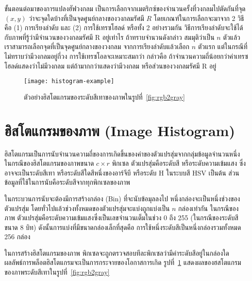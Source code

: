 ขั้นตอนต่อมาของการแปลงฮัฟวงกลม เป็นการเลือกจากเมตริกซ์ของจำนวนครั้งที่วงกลมไปตัดกันที่จุด $(x,y)$ ว่าจะจุดใดบ้างที่เป็นจุดศูนย์กลางของวงกลมรัศมี $R$ โดยเกณฑ์ในการเลือกจะมาจาก 2 วิธี คือ (1) การเรียงลำดับ และ (2) การใช้เทรซโฮลด์ หรือทั้ง 2 อย่างรวมกัน วิธีการเรียงลำดับจะใช้ได้กับภาพที่รู้ว่ามีจำนวนของวงกลมรัศมี R อยู่เท่าไร ถ้าทราบจำนวนดังกล่าว สมมุติว่าเป็น $n$ ตัวแล้ว เราสามารถเลือกจุดที่เป็นจุดศูนย์กลางของวงกลม จากการเรียงลำดับแล้วเลือก $n$ ตัวแรก แต่ในกรณีที่ไม่ทราบว่ามีวงกลมอยู่กี่วง การใช้เทรซโอลจะเหมาะสมกว่า กล่าวคือ ถ้าจำนวนความถี่น้อยกว่าค่าเทรซโฮลด์แสดงว่าไม่มีวงกลม แต่ถ้ามากกว่าแสดงว่ามีวงกลม หรือส่วนของวงกลมรัศมี R อยู่

\begin{figure}[!ht]
\centering
\texttt{[image: histogram-example]}
\caption{ตัวอย่างฮิสโตแกรมของระดับสีเทาของภาพในรูปที่~\ref{fig:rgb2gray}}
\label{fig:histogram}
\end{figure}

\section{ฮิสโตแกรมของภาพ (Image Histogram)}
ฮิสโตแกรมเป็นการนับจำนวนความถี่ของการเกิดขึ้นของค่าของตัวแปรสุ่มจากกลุ่มข้อมูลจำนวนหนึ่ง ในกรณีของฮิสโตแกรมของภาพขนาด $c\times r$ พิกเซล ตัวแปรสุ่มคือระดับสี หรือระดับความเข้มแสง ซึ่งอาจจะเป็นระดับสีเทา หรือระดับสีใดสีหนึ่งของอาร์จีบี หรือระดับ H ในระบบสี HSV เป็นต้น ส่วนข้อมูลที่ใช้ในการนับคือระดับสีจากทุกพิกเซลของภาพ

ในกระบวนการนับจะต้องมีการสร้างกล่อง (Bin) ที่จะนับข้อมุลลงไป หนึ่งกล่องจะเป็นหนึ่งช่วงของตัวแปรสุ่ม โดยทั่วไปแล้วช่วงทั้งหมดของตัวแปรสุ่มจะแบ่งถูกแบ่งเป็น $n$ กล่องเท่ากัน ในกรณีของภาพ ตัวแปรสุ่มคือระดับความเข้มแสงซึ่งเป็นเลขจำนวนเต็มในช่วง 0 ถึง 255  (ในกรณีของระดับสีขนาด 8 บิท) ดังนั้นการแบ่งที่มีขนาดกล่องเล็กที่สุดคือ การใช้หนึ่งระดับสีเป็นหนึ่งกล่องรวมทั้งหมด  256 กล่อง

ในการสร้างฮิสโตแกรมของภาพ พิกเซลจะถูกตรวจสอบทีละพิกเซลว่ามีค่าระดับสีอยู่ในกล่องใด ผลลัพธ์การพล็อตฮิสโตแกรมจะเป็นการกระจายของโอกาสการเกิด รูปที่~\ref{fig:histogram} แสดงผลของฮสโตแกรมของภาพระดับสีเทาในรูปที่~\ref{fig:rgb2gray}

%
%


